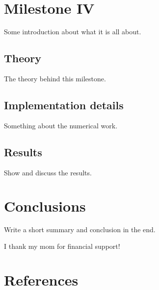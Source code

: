 \documentclass{aa}
\begin{document}
\section{Milestone IV}
Some introduction about what it is all about.

\subsection{Theory}
The theory behind this milestone.

\subsection{Implementation details}
Something about the numerical work.

\subsection{Results}
Show and discuss the results.

\section{Conclusions}

Write a short summary and conclusion in the end. 

\begin{acknowledgements}
      I thank my mom for financial support!
\end{acknowledgements}

\section*{References}

%
\end{document}
